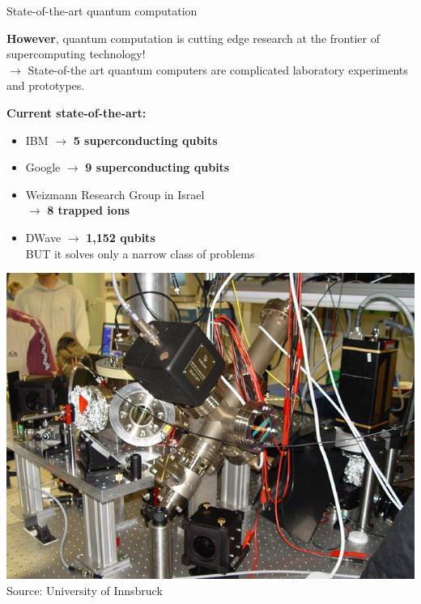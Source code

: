 \documentclass[10pt]{beamer}
\begin{document}
{
\begin{frame}[fragile]{State-of-the-art quantum computation}

\textbf{However}, quantum computation is cutting edge research at the frontier of supercomputing technology!\\
\vspace{0.1cm}
$\rightarrow$ State-of-the art quantum computers are complicated laboratory experiments and prototypes.

\begin{minipage}[c]{0.59\textwidth}
\vspace{0.3cm}
\textbf{Current state-of-the-art:}\\
\begin{itemize}
\item IBM $\rightarrow$ \textbf{5 superconducting qubits}
\item Google $\rightarrow$ \textbf{9 superconducting qubits}
\item Weizmann Research Group in Israel\\$\rightarrow$ \textbf{8 trapped ions}
\item DWave $\rightarrow$ \textbf{1,152 qubits}\\BUT it solves only a narrow class of problems
\end{itemize}
\end{minipage}%
\begin{minipage}[c]{0.39\textwidth}
\includegraphics[scale=0.18]{ion-trap.jpg}\\
\centering
\tiny{Source: University of Innsbruck}
\end{minipage}

\end{frame}
}
\end{document}

